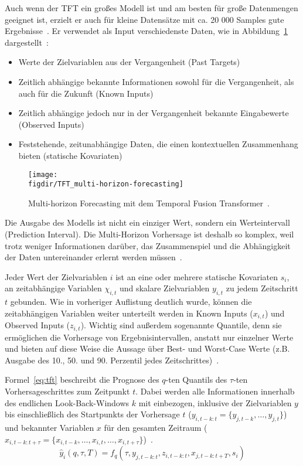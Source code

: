 Auch wenn der \ac{TFT} ein großes Modell ist und am besten für große Datenmengen geeignet ist, erzielt er auch für kleine Datensätze mit ca. 20 000 Samples gute Ergebnisse~\cite{Beitner.2020}.
Er verwendet als Input verschiedenste Daten, wie in Abbildung~\ref{FIG:tft-forecasting} dargestellt~\cite{Lim.19.12.2019}:
\begin{itemize}
 \item Werte der Zielvariablen aus der Vergangenheit (Past Targets)
 \item Zeitlich abhängige bekannte Informationen sowohl für die Vergangenheit, als auch für die Zukunft (Known Inputs)
 \item Zeitlich abhängige jedoch nur in der Vergangenheit bekannte Eingabewerte (Observed Inputs)
 \item Feststehende, zeitunabhängige Daten, die einen kontextuellen Zusammenhang bieten (statische Kovariaten)
\end{itemize}
\begin{figure}
 \caption{Multi-horizon Forecasting mit dem Temporal Fusion Transformer~\cite{Lim.19.12.2019}.}
 {\texttt{[image: \\figdir/TFT\_multi-horizon-forecasting]}}
 \label{FIG:tft-forecasting}
\end{figure}
Die Ausgabe des Modells ist nicht ein einziger Wert, sondern ein Werteintervall (Prediction Interval).
Die Multi-Horizon Vorhersage ist deshalb so komplex, weil trotz weniger Informationen darüber, das Zusammenspiel und die Abhängigkeit der Daten untereinander erlernt werden müssen~\cite{Lim.19.12.2019}.

Jeder Wert der Zielvariablen $i$ ist an eine oder mehrere statische Kovariaten $s_i$, an zeitabhängige Variablen $\chi_{i,t}$ und skalare Zielvariablen $y_{i,t}$ zu jedem Zeitschritt $t$ gebunden.
Wie in vorheriger Auflistung deutlich wurde, können die zeitabhängigen Variablen weiter unterteilt werden in Known Inputs ($x_{i,t}$) und Observed Inputs ($z_{i,t}$).
Wichtig sind außerdem sogenannte Quantile, denn sie ermöglichen die Vorhersage von Ergebnisintervallen, anstatt nur einzelner Werte und bieten auf diese Weise die Aussage über Best- und Worst-Case Werte (z.B. Ausgabe des 10., 50. und 90. Perzentil jedes Zeitschrittes)~\cite{Lim.19.12.2019}.

Formel~\ref{eq:tft} beschreibt die Prognose des $q$-ten Quantils des $\tau$-ten Vorhersageschrittes zum Zeitpunkt $t$.
Dabei werden alle Informationen innerhalb des endlichen Look-Back-Windows $k$ mit einbezogen, inklusive der Zielvariablen $y$ bis einschließlich des Startpunkts der Vorhersage $t$ ($y_{i,t-k:t} = \{y_{j,t-k}, \ldots, y_{j,t}\}$) und bekannter Variablen $x$ für den gesamten Zeitraum ($x_{i,t-k:t+\tau} = \{x_{i,t-k}, \ldots, x_{i,t}, \ldots, x_{i,t+\tau}\}$)~\cite{Lim.19.12.2019}.
\begin{equation}
 \label{eq:tft}
 \hat{y}_i(q, \tau, T) = f_q(\tau, y_{j,t-k:t}, z_{i,t-k:t}, x_{j,t-k:t+T}, s_i)
\end{equation}

